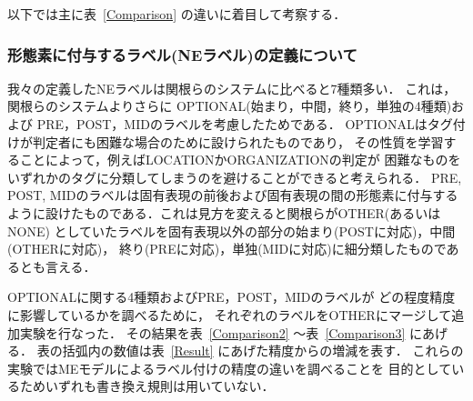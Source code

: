 以下では主に表~\ref{Comparison} の違いに着目して考察する．

\subsubsection{形態素に付与するラベル(NEラベル)の定義について}

我々の定義したNEラベルは関根らのシステムに比べると7種類多い．
これは，関根らのシステムよりさらに
OPTIONAL(始まり，中間，終り，単独の4種類)および
PRE，POST，MIDのラベルを考慮したためである．
OPTIONALはタグ付けが判定者にも困難な場合のために設けられたものであり，
その性質を学習することによって，例えばLOCATIONかORGANIZATIONの判定が
困難なものをいずれかのタグに分類してしまうのを避けることができると考えられる．
PRE, POST, MIDのラベルは固有表現の前後および固有表現の間の形態素に付与する
ように設けたものである．これは見方を変えると関根らがOTHER(あるいはNONE)
としていたラベルを固有表現以外の部分の始まり(POSTに対応)，中間(OTHERに対応)，
終り(PREに対応)，単独(MIDに対応)に細分類したものであるとも言える．

OPTIONALに関する4種類およびPRE，POST，MIDのラベルが
どの程度精度に影響しているかを調べるために，
それぞれのラベルをOTHERにマージして追加実験を行なった．
その結果を表~\ref{Comparison2} 〜表~\ref{Comparison3} にあげる．
表の括弧内の数値は表~\ref{Result} にあげた精度からの増減を表す．
これらの実験ではMEモデルによるラベル付けの精度の違いを調べることを
目的としているためいずれも書き換え規則は用いていない．

